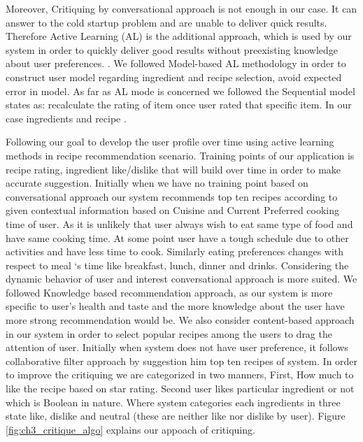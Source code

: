 Moreover, Critiquing by conversational approach is not enough in our case. It can answer to the cold startup problem and are unable to deliver quick results. Therefore Active Learning (AL) is the additional approach, which is used by our system in order to quickly deliver good results without preexisting knowledge about user preferences. \cite{lamche2014active}. We followed Model-based AL methodology in order to construct user model regarding ingredient and recipe selection, avoid expected error in model. As far as AL mode is concerned we followed the Sequential model states as: recalculate the rating of item once user rated that specific item. In our case ingredients and recipe \cite{rashid2008learning}.\newline

Following our goal to develop the user profile over time using active learning methods in recipe recommendation scenario. Training points of our application is recipe rating, ingredient like/dislike that will build over time in order to make accurate suggestion. Initially when we have no training point based on conversational approach our system recommends top ten recipes according to given contextual information based on Cuisine and Current Preferred cooking time of user. As it is unlikely that user always wish to eat same type of food and have same cooking time. At some point user have a tough schedule due to other activities and have less time to cook. Similarly eating preferences changes with respect to meal ‘s time like breakfast, lunch, dinner and drinks. Considering the dynamic behavior of user and interest conversational approach is more suited. We followed Knowledge based recommendation approach, as our system is more specific to user’s health and taste and the more knowledge about the user have more strong recommendation would be. We also consider content-based approach in our system in order to select popular recipes among the users to drag the attention of user. Initially when system does not have user preference, it follows collaborative filter approach by suggestion him top ten recipes of system. In order to improve the critiquing we are categorized in two manners, First, How much to like the recipe based on star rating. Second user likes particular ingredient or not which is Boolean in nature. Where system categories each ingredients in three state like, dislike and neutral (these are neither like nor dislike by user). Figure \ref{fig:ch3_critique_algo} explains our appoach of critiquing.

